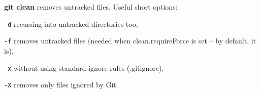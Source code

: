 %

\textbf{git clean} removes untracked files.
Useful short options:
\begin{compactenum}
\item [\texttt{-d}] recursing into untracked directories too,
\item [\texttt{-f}] removes untracked files (needed when clean.requireForce is set -- by default, it is),
\item [\texttt{-x}] without using standard ignore rules (.gitignore).
\item [\texttt{-X}] removes only files ignored by Git.
\end{compactenum}

%